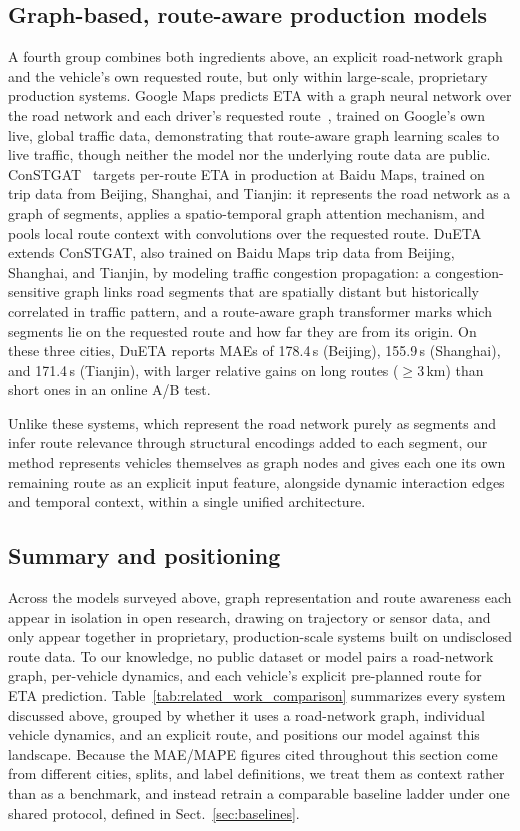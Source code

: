 \documentclass[pdflatex,sn-basic,Numbered]{sn-jnl}%
\begin{document}
\subsection{Graph-based, route-aware production models}\label{sec:rw-graph-route}
A fourth group combines both ingredients above, an explicit road-network graph and the vehicle's own requested route, but only within large-scale, proprietary production systems. Google Maps predicts ETA with a graph neural network over the road network and each driver's requested route~\cite{derrowpinion2021googlemaps}, trained on Google's own live, global traffic data, demonstrating that route-aware graph learning scales to live traffic, though neither the model nor the underlying route data are public. ConSTGAT~\cite{constgat2020} targets per-route ETA in production at Baidu Maps, trained on trip data from Beijing, Shanghai, and Tianjin: it represents the road network as a graph of segments, applies a spatio-temporal graph attention mechanism, and pools local route context with convolutions over the requested route. DuETA~\cite{dueta2023} extends ConSTGAT, also trained on Baidu Maps trip data from Beijing, Shanghai, and Tianjin, by modeling traffic congestion propagation: a congestion-sensitive graph links road segments that are spatially distant but historically correlated in traffic pattern, and a route-aware graph transformer marks which segments lie on the requested route and how far they are from its origin. On these three cities, DuETA reports MAEs of 178.4\,s (Beijing), 155.9\,s (Shanghai), and 171.4\,s (Tianjin), with larger relative gains on long routes ($\geq$3\,km) than short ones in an online A/B test.

Unlike these systems, which represent the road network purely as segments and infer route relevance through structural encodings added to each segment, our method represents vehicles themselves as graph nodes and gives each one its own remaining route as an explicit input feature, alongside dynamic interaction edges and temporal context, within a single unified architecture.

\subsection{Summary and positioning}
Across the models surveyed above, graph representation and route awareness each appear in isolation in open research, drawing on trajectory or sensor data, and only appear together in proprietary, production-scale systems built on undisclosed route data. To our knowledge, no public dataset or model pairs a road-network graph, per-vehicle dynamics, and each vehicle's explicit pre-planned route for ETA prediction. Table~\ref{tab:related_work_comparison} summarizes every system discussed above, grouped by whether it uses a road-network graph, individual vehicle dynamics, and an explicit route, and positions our model against this landscape. Because the MAE/MAPE figures cited throughout this section come from different cities, splits, and label definitions, we treat them as context rather than as a benchmark, and instead retrain a comparable baseline ladder under one shared protocol, defined in Sect.~\ref{sec:baselines}.
\end{document}
